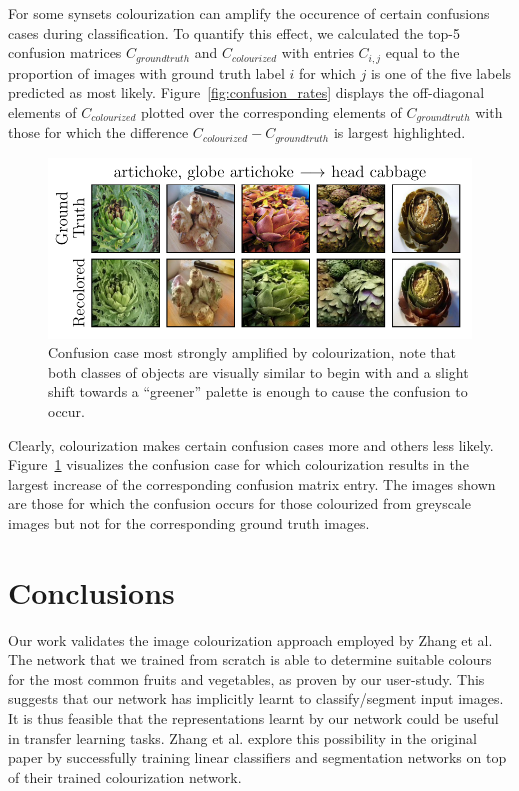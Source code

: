 \documentclass{article}
\begin{document}
For some synsets colourization can amplify the occurence of certain confusions
cases during classification. To quantify this effect, we calculated the top-5
confusion matrices $C_{ground truth}$ and $C_{colourized}$ with entries
$C_{i,j}$ equal to the proportion of images with ground truth label $i$
for which $j$ is one of the five labels predicted as most likely.
Figure~\ref{fig:confusion_rates} displays the off-diagonal elements of
$C_{colourized}$ plotted over the corresponding elements of $C_{ground truth}$
with those for which the difference $C_{colourized} - C_{ground truth}$ is
largest highlighted.

\begin{figure}
    \centering
    \includegraphics{resources/common_confusions.pdf}
    \caption{Confusion case most strongly amplified by colourization, note that
             both classes of objects are visually similar to begin with and a
             slight shift towards a ``greener'' palette is enough to cause the
             confusion to occur.}
    \label{fig:common_confusions}
\end{figure}

Clearly, colourization makes certain confusion cases more and others less
likely. Figure~\ref{fig:common_confusions} visualizes the confusion case for
which colourization results in the largest increase of the corresponding
confusion matrix entry. The images shown are those for which the confusion
occurs for those colourized from greyscale images but not for the corresponding
ground truth images.

\section{Conclusions}

Our work validates the image colourization approach employed by Zhang et al.
The network that we trained from scratch is able to determine suitable colours
for the most common fruits and vegetables, as proven by our user-study. This
suggests that our network has implicitly learnt to classify/segment input
images. It is thus feasible that the representations learnt by our network
could be useful in transfer learning tasks. Zhang et al. explore this
possibility in the original paper by successfully training linear classifiers
and segmentation networks on top of their trained colourization network.
\end{document}
